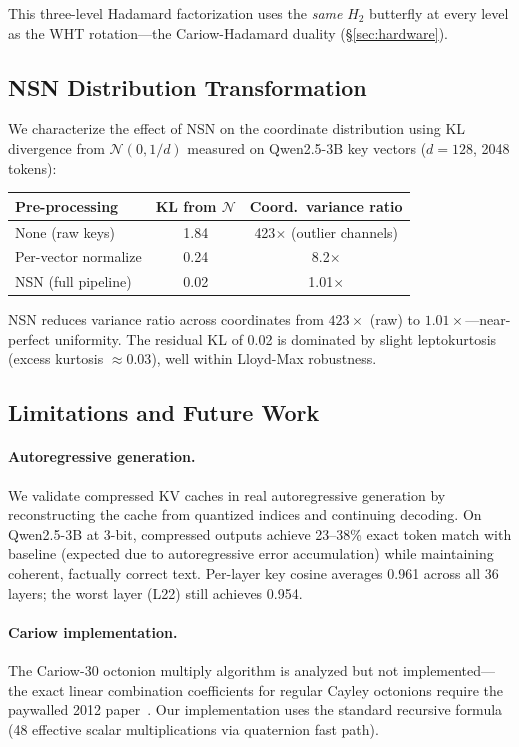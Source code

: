 \documentclass[sigconf,anonymous,review]{acmart}
\begin{document}
This three-level Hadamard factorization uses the \emph{same}
$H_2$ butterfly at every level as the WHT rotation---the
Cariow-Hadamard duality (\S\ref{sec:hardware}).

\subsection{NSN Distribution Transformation}

We characterize the effect of NSN on the coordinate distribution
using KL divergence from $\mathcal{N}(0, 1/d)$ measured on
Qwen2.5-3B key vectors ($d=128$, 2048 tokens):

\begin{center}
\begin{tabular}{lcc}
\toprule
Pre-processing & KL from $\mathcal{N}$ & Coord.\ variance ratio \\
\midrule
None (raw keys)        & 1.84 & 423$\times$ (outlier channels) \\
Per-vector normalize   & 0.24 & 8.2$\times$ \\
NSN (full pipeline)    & 0.02 & 1.01$\times$ \\
\bottomrule
\end{tabular}
\end{center}

NSN reduces variance ratio across coordinates from $423\times$
(raw) to $1.01\times$---near-perfect uniformity. The residual
KL of 0.02 is dominated by slight leptokurtosis (excess
kurtosis $\approx 0.03$), well within Lloyd-Max robustness.

\subsection{Limitations and Future Work}

\paragraph{Autoregressive generation.}
We validate compressed KV caches in real autoregressive generation
by reconstructing the cache from quantized indices and continuing
decoding. On Qwen2.5-3B at 3-bit, compressed outputs achieve
23--38\% exact token match with baseline (expected due to
autoregressive error accumulation) while maintaining coherent,
factually correct text. Per-layer key cosine averages 0.961
across all 36 layers; the worst layer (L22) still achieves 0.954.

\paragraph{Cariow implementation.}
The Cariow-30 octonion multiply algorithm is analyzed but not
implemented---the exact linear combination coefficients for regular
Cayley octonions require the paywalled 2012 paper~\cite{cariow2012}.
Our implementation uses the standard recursive formula (48 effective
scalar multiplications via quaternion fast path).
\end{document}
